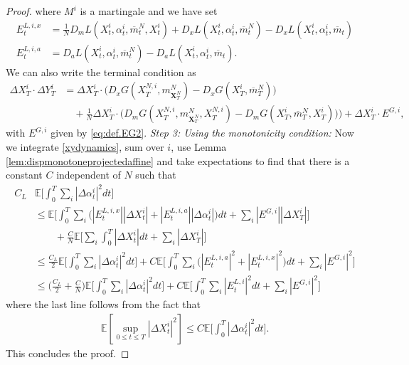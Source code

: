 \documentclass[11pt,reqno]{amsart}
\numberwithin{equation}{section}
\theoremstyle{definition}
\def\E{{\mathbb E}}
\newcommand{\bX}{\mathbf{X}}
\newcommand{\ov}{\overline}
\newcommand\cF{\mathcal F}
\newcommand\cL{\mathcal L}
\def \E{\mathbb{E}}
\begin{document}
\begin{proof}
where $M^i$ is a martingale and we have set 
\begin{align*}
E_t^{L,i,x} &= 
\frac{1}{N}  D_m L(X_t^{i}, \alpha_t^{i}, \ov{m}_t^N, X_t^{i}) + D_x L(X_t^i,\alpha_t^i, \ov{m}_t^N) -  D_x L(X_t^i,\alpha_t^i, \ov{m}_t)  \nonumber \\
E_t^{L,i,a} &= D_a L(X_t^i,\alpha_t^i, \ov{m}_t^N) -  D_a L(X_t^i, \alpha_t^i, \ov{m}_t).
\end{align*}
We can also write the terminal condition as
\begin{align*}
  \Delta X_T^i \cdot \Delta Y_T^i &= \Delta X_T^{i} \cdot \big(D_x G(X_T^{N,i}, m_{\bX_T^N}^N) - D_x G(X_T^i, \ov{m}_T^N) \big) \\
  &\quad+ \frac{1}{N} \Delta X_T^i \cdot \big(D_m G(X_T^{N,i}, m_{\bX_T^N}^N, X_T^{N,i}) - D_m G(X_T^{i}, \ov{m}_T^N, X_T^{i})  \big) \big) + \Delta X_T^i \cdot  E^{G,i}, 
\end{align*}
with $ E^{G,i}$ given by \eqref{eq:def.EG2}.
\newline \newline \noindent 
\textit{Step 3: Using the monotonicity condition:}
Now we integrate \eqref{xydynamics}, sum over $i$, use Lemma \ref{lem:dispmonotoneprojectedaffine} and take expectations to find that there is a constant $C$ independent of $N$ such that
\begin{align} %
C_L &\E \bigg[\int_0^T \sum_i |\Delta \alpha_t^i|^2 dt \bigg] \nonumber \\
&\leq \E \bigg[ \int_0^T \sum_i \Big( |E_t^{L,i,x}||\Delta X_t^i|   + |E_t^{L,i,a}| |\Delta \alpha_t^i|
\Big) dt + \sum_i |E^{G,i}| |\Delta X_T^i| \bigg] \nonumber  \\
&\qquad + \frac{C}{N} \E\bigg[\sum_i \int_0^T |\Delta X_t^i|dt + \sum_i |\Delta X_T^i|  \bigg]
\nonumber \\
&\leq \frac{C_L}{2} \E\bigg[\int_0^T \sum_i |\Delta \alpha_t^i|^2 dt\bigg] + C \E\bigg[\int_0^T \sum_i \Big( |E_t^{L,i,a}|^2 + |E_t^{L,i,x}|^2 \Big) 
dt + \sum_i |E^{G,i}|^2 \bigg] \nonumber  \\
&\leq \big(\frac{C_L}{2} + \frac{C}{N}\big) \E\bigg[\int_0^T \sum_i |\Delta \alpha_t^i|^2 dt\bigg] + C \E\bigg[\int_0^T \sum_i |E_t^{L,i}|^2
dt + \sum_i |E^{G,i}|^2 \bigg] 
\end{align}
where the last line follows from the fact that
\begin{align} \label{xalphaboundaffine}
  \E[\sup_{0 \leq t \leq T} |\Delta X_t^i|^2] \leq C \E\bigg[\int_0^T |\Delta \alpha_t^i|^2 dt\bigg]. 
\end{align}
This concludes the proof.
\end{proof}
\end{document}
